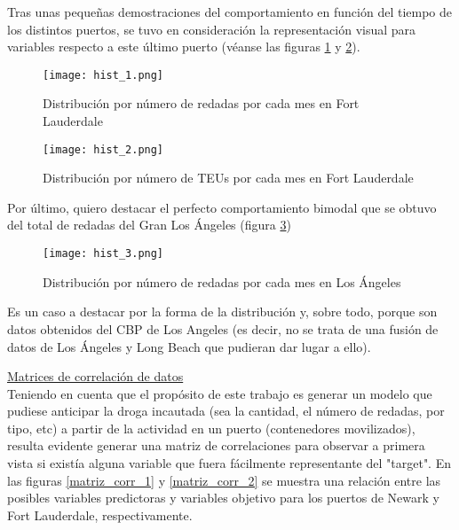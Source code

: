\documentclass[12pt]{article}
\begin{document}
		Tras unas pequeñas demostraciones del comportamiento en función del tiempo de los distintos puertos, se tuvo en consideración la representación visual para variables respecto a este último puerto (véanse las figuras \ref{hist_1} y \ref{hist_2}).
		
		\begin{figure}[H]
			\caption{\label{hist_1} Distribución por número de redadas por cada mes en Fort Lauderdale}
			\centering
			\hspace*{1cm}
			\texttt{[image: hist\_1.png]}
		\end{figure}
	
		\begin{figure}[H]
			\caption{\label{hist_2} Distribución por número de TEUs por cada mes en Fort Lauderdale}
			\centering
			\hspace*{1cm}
			\texttt{[image: hist\_2.png]}
		\end{figure}
	
		Por último, quiero destacar el perfecto comportamiento bimodal que se obtuvo del total de redadas del Gran Los Ángeles (figura  \ref{hist_3})
		
		\begin{figure}[H]
			\caption{\label{hist_3} Distribución por número de redadas por cada mes en Los Ángeles}
			\centering
			\hspace*{1cm}
			\texttt{[image: hist\_3.png]}
		\end{figure}
	
		Es un caso a destacar por la forma de la distribución y, sobre todo, porque son datos obtenidos del CBP de Los Angeles (es decir, no se trata de una fusión de datos de Los Ángeles y Long Beach que pudieran dar lugar a ello).
		
		
		\underline{Matrices de correlación de datos}\\
		Teniendo en cuenta que el propósito de este trabajo es generar un modelo que pudiese anticipar la droga incautada (sea la cantidad, el número de redadas, por tipo, etc) a partir de la actividad en un puerto (contenedores movilizados), resulta evidente generar una matriz de correlaciones para observar a primera vista si existía alguna variable que fuera fácilmente representante del "target". En las figuras \ref{matriz_corr_1} y \ref{matriz_corr_2} se muestra una relación entre las posibles variables predictoras y variables objetivo para los puertos de Newark y Fort Lauderdale, respectivamente.
		
\end{document}

